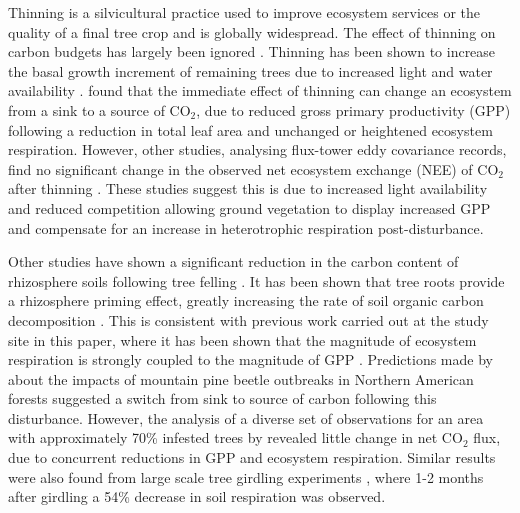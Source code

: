 \documentclass[draft,linenumbers]{agujournal}
\begin{document}
Thinning is a silvicultural practice used to improve ecosystem services or the quality of a final tree crop and is globally widespread. The effect of thinning on carbon budgets has largely been ignored \citep{JGRG:JGRG779}. {\color{blue}Thinning has been shown to increase the basal growth increment of remaining trees due to increased light and water availability \citep{breda95thin, martin2010response}. \citet{Misson2005207} found that the immediate effect of thinning can change an ecosystem from a sink to a source of CO$_{2}$, due to reduced gross primary productivity (GPP) following a reduction in total leaf area and unchanged or heightened ecosystem respiration}. However, other studies, analysing flux-tower eddy covariance records, find no significant change in the observed net ecosystem exchange (NEE) of CO\(_{2}\) after thinning \citep{vesala2005effect, moreaux2011paired,  dore2012recovery, Saunders20121, wilkinson2015effects}. These studies suggest this is due to increased light availability and reduced competition allowing ground vegetation to display increased GPP and compensate for an increase in heterotrophic respiration post-disturbance.  

Other studies have shown a significant reduction in the carbon content of rhizosphere soils following tree felling \citep{Hernesmaa2005777}. It has been shown that tree roots provide a rhizosphere priming effect, greatly increasing the rate of soil organic carbon decomposition \citep{ELE:ELE1095}. This is consistent with previous work carried out at the study site in this paper, where it has been shown that the magnitude of ecosystem respiration is strongly coupled to the magnitude of GPP \citep{heinemeyer2012exploring}. Predictions made by \citet{kurz2008mountain} about the impacts of mountain pine beetle outbreaks in Northern American forests suggested a switch from sink to source of carbon following this disturbance. However, the analysis of a diverse set of observations for an area with approximately 70\% infested trees by \citet{ELE:ELE12097} revealed little change in net CO\(_{2}\) flux, due to concurrent reductions in GPP and ecosystem respiration. Similar results were also found from large scale tree girdling experiments \citep{hogberg2001large}, where 1-2 months after girdling a 54\% decrease in soil respiration was observed.
\end{document}
